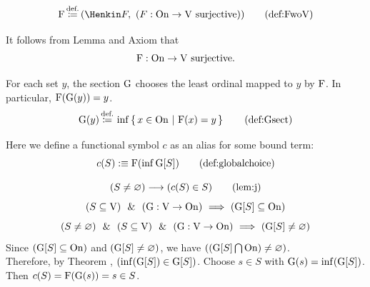 \begin{definition}

\[
\text{F}
\eqdef
(\Henkin F,\ (F:\On \to \V \text{ surjective}))
\labeltagd{def}{FwoV}
\]
\end{definition}%
It follows from Lemma  and Axiom  that
\[
\mathrm{F}:\mathrm{On} \to \mathrm{V} \text{ surjective}.
\]

\begin{definition}
For each set $y$, the section $\mathrm{G}$ chooses the least ordinal mapped to $y$ by $\mathrm{F}$. In particular, $\mathrm{F}(\mathrm{G}(y))=y$.
\[
\G(y)\eqdef\inf\cc{x\in\On}{\text{F}(x)=y}
\labeltagd{def}{Gsect}
\]
\end{definition}

\begin{definition}
Here we define a functional symbol $c$ as an alias for some bound term:
\[
c(S) :\equiv \F(\inf \G[S])
\labeltagd{def}{globalchoice}
\]

\end{definition}

\begin{lemma}
\[
(S\neq\emptyclass)\implies(c(S)\in S)
\labeltagd{lem}{j}
\]
\Proof
\[
(S\subseteq \mathrm{V})
\ \ \&\ \ 
(\mathrm{G} : \mathrm{V}\to \mathrm{On})
\ \Longrightarrow\ 
(\mathrm{G}[S]\subseteq\mathrm{On})
\]
\[
(S\neq\varnothing)
\ \ \&\ \ 
(S\subseteq \mathrm{V})
\ \ \&\ \ 
(\mathrm{G} : \mathrm{V}\to \mathrm{On})
\ \Longrightarrow\ 
(\mathrm{G}[S]\neq\varnothing)
\]
Since $(\mathrm{G}[S]\subseteq\mathrm{On})$ and $(\mathrm{G}[S]\neq\varnothing)$, we have $((\mathrm{G}[S]\bigcap \mathrm{On})\neq\varnothing)$.\\
Therefore, by Theorem , $(\inf(\mathrm{G}[S])\in \mathrm{G}[S])$. Choose $s\in S$ with $\mathrm{G}(s)=\inf(\mathrm{G}[S])$. Then $c(S)=\mathrm{F}(\mathrm{G}(s))=s\in S$.
\Done
\end{lemma}


